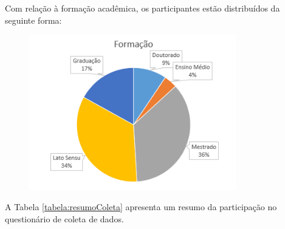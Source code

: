 Com relação à formação acadêmica, os participantes estão distribuídos da seguinte forma:
\begin{figure}[h]
\centering %
\includegraphics[width=9cm]{figuras/apendiceC_formacao.png}
\end{figure}

A Tabela \ref{tabela:resumoColeta} apresenta um resumo da participação no questionário de coleta de dados.

